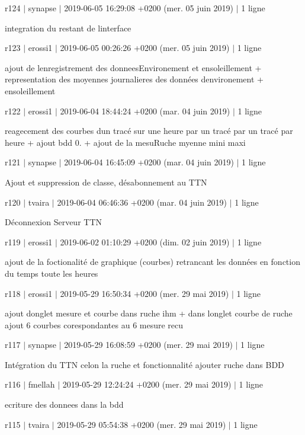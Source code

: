 r124 $\vert$ synapse $\vert$ 2019-\/06-\/05 16\+:29\+:08 +0200 (mer. 05 juin 2019) $\vert$ 1 ligne

integration du restant de l\textquotesingle{}interface

r123 $\vert$ erossi1 $\vert$ 2019-\/06-\/05 00\+:26\+:26 +0200 (mer. 05 juin 2019) $\vert$ 1 ligne

ajout de l\textquotesingle{}enregistrement des donnees\+Environement et ensoleillement + representation des moyennes journalieres des données d\textquotesingle{}environement + ensoleillement

r122 $\vert$ erossi1 $\vert$ 2019-\/06-\/04 18\+:44\+:24 +0200 (mar. 04 juin 2019) $\vert$ 1 ligne

reagecement des courbes d\textquotesingle{}un tracé sur une heure par un tracé par un tracé par heure + ajout bdd 0. + ajout de la mesu\+Ruche myenne mini maxi

r121 $\vert$ synapse $\vert$ 2019-\/06-\/04 16\+:45\+:09 +0200 (mar. 04 juin 2019) $\vert$ 1 ligne

Ajout et suppression de classe, désabonnement au T\+TN

r120 $\vert$ tvaira $\vert$ 2019-\/06-\/04 06\+:46\+:36 +0200 (mar. 04 juin 2019) $\vert$ 1 ligne

Déconnexion Serveur T\+TN

r119 $\vert$ erossi1 $\vert$ 2019-\/06-\/02 01\+:10\+:29 +0200 (dim. 02 juin 2019) $\vert$ 1 ligne

ajout de la foctionalité de graphique (courbes) retrancant les données en fonction du temps toute les heures

r118 $\vert$ erossi1 $\vert$ 2019-\/05-\/29 16\+:50\+:34 +0200 (mer. 29 mai 2019) $\vert$ 1 ligne

ajout d\textquotesingle{}onglet mesure et courbe dans ruche ihm + dans l\textquotesingle{}onglet courbe de ruche ajout 6 courbes corespondantes au 6 mesure recu

r117 $\vert$ synapse $\vert$ 2019-\/05-\/29 16\+:08\+:59 +0200 (mer. 29 mai 2019) $\vert$ 1 ligne

Intégration du T\+TN celon la ruche et fonctionnalité ajouter ruche dans B\+DD

r116 $\vert$ fmellah $\vert$ 2019-\/05-\/29 12\+:24\+:24 +0200 (mer. 29 mai 2019) $\vert$ 1 ligne

ecriture des donnees dans la bdd

r115 $\vert$ tvaira $\vert$ 2019-\/05-\/29 05\+:54\+:38 +0200 (mer. 29 mai 2019) $\vert$ 1 ligne

